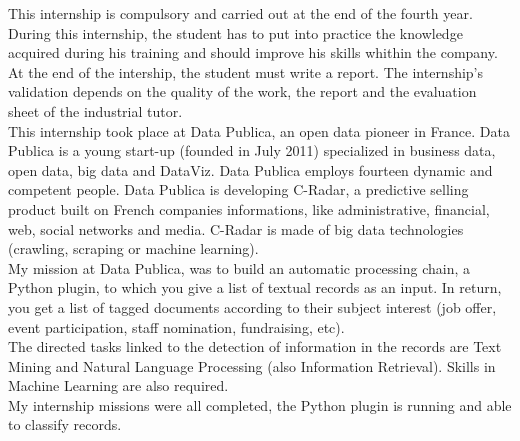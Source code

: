 This internship is compulsory and carried out at the end of the fourth year. During this internship, the student has to put into practice the knowledge acquired during his training and should improve his skills whithin the company. At the end of the intership, the student must write a report. The internship's validation depends on the quality of the work, the report and the evaluation sheet of the industrial tutor.\\
This internship took place at Data Publica, an open data pioneer in France. Data Publica is a young start-up (founded in July 2011) specialized in business data, open data, big data and DataViz. Data Publica employs fourteen dynamic and competent people. Data Publica is developing C-Radar, a predictive selling product built on French companies informations, like administrative, financial, web, social networks and media. C-Radar is made of big data technologies (crawling, scraping or machine learning).\\
My mission at Data Publica, was to build an automatic processing chain, a Python plugin, to which you give a list of textual records as an input. In return, you get a list of tagged documents according to their subject interest (job offer, event participation, staff nomination, fundraising, etc).\\
The directed tasks linked to the detection of information in the records are Text Mining and Natural Language Processing (also Information Retrieval). Skills in Machine Learning are also required.\\
My internship missions were all completed, the Python plugin is running and able to classify records.